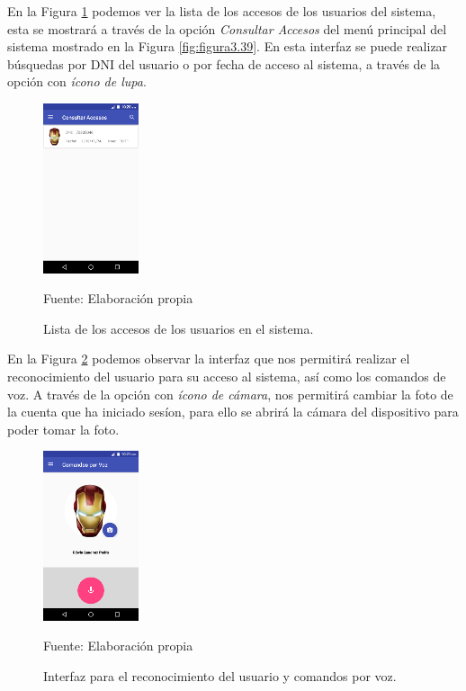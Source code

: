 En la Figura \ref{fig:figura3.47} podemos ver la lista de los accesos de los usuarios del sistema, esta se mostrará a través de la opción \textit{Consultar Accesos} del menú principal del sistema mostrado en la Figura \ref{fig:figura3.39}. En esta interfaz se puede realizar búsquedas por DNI del usuario o por fecha de acceso al sistema, a través de la opción con \textit{ícono de lupa}.
\begin{figure}[H]
\captionsetup{justification=centering}
\begin{center}
\includegraphics[width=0.25\textwidth]{Imagenes/Cap3/image047}
\end{center}
\begin{center}
\vskip -0.5cm
\caption{\small{Lista de los accesos de los usuarios en el sistema.}}
\label{fig:figura3.47}
{\small{Fuente: Elaboración propia}}
\end{center}
\end{figure}

En la Figura \ref{fig:figura3.48} podemos observar la interfaz que nos permitirá realizar el reconocimiento del usuario para su acceso al sistema, así como los comandos de voz. A través de la opción con \textit{ícono de cámara}, nos permitirá cambiar la foto de la cuenta que ha iniciado sesíon, para ello se abrirá la cámara del dispositivo para poder tomar la foto.
\begin{figure}[H]
\captionsetup{justification=centering}
\begin{center}
\includegraphics[width=0.25\textwidth]{Imagenes/Cap3/image048}
\end{center}
\begin{center}
\vskip -0.5cm
\caption{\small{Interfaz para el reconocimiento del usuario y comandos por voz.}}
\label{fig:figura3.48}
{\small{Fuente: Elaboración propia}}
\end{center}
\end{figure}

